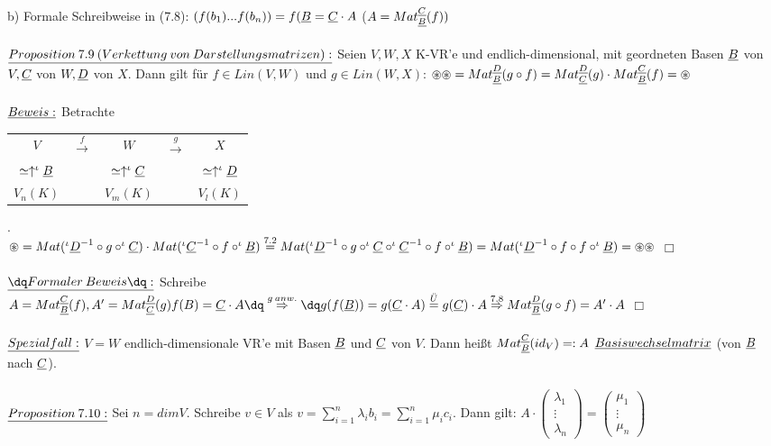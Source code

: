 \documentclass[fleqn, a4paper, 11pt]{scrartcl}
\theoremstyle{definition}
\begin{document}
b) Formale Schreibweise in (7.8): $(f(b_1)...f(b_n))=f(\uline{B}=\uline{C}\cdot A$ ($A=Mat_{\uline{B}}^{\uline{C}}(f))$\\
\\
$\uline{Proposition\:7.9\:(Verkettung\:von\:Darstellungsmatrizen):}$ Seien $V,W,X$ K-VR'e und endlich-dimensional, mit geordneten Basen $\uline{B}$ von $V,\uline{C}$ von $W,\uline{D}$ von $X$. Dann gilt für $f\in Lin(V,W)$ und $g\in Lin(W,X)$: $\circledast\circledast=Mat_{\uline{B}}^{\uline{D}}(g\circ f)=Mat_{\uline{C}}^{\uline{D}}(g)\cdot Mat_{\uline{B}}^{\uline{C}}(f)=\circledast$\\
\\
$\uline{Beweis:}$ Betrachte \begin{tabular}{ccccc}
	$V$ & $\stackrel{f}{\rightarrow}$ & $W$ & $\stackrel{g}{\rightarrow}$ & $X$ \\
	$\simeq\uparrow ^\iota\uline{B}$ & & $\simeq\uparrow ^\iota\uline{C}$ & & $\simeq\uparrow ^\iota\uline{D}$\\
	$V_n(K)$ & & $V_m(K)$ & & $V_l(K)$
\end{tabular}.\\
$\circledast=Mat(^\iota\uline{D}^{-1}\circ g\circ ^\iota\uline{C})\cdot Mat(^\iota\uline{C}^{-1}\circ f\circ ^\iota\uline{B})\stackrel{7.2}{=}Mat(^\iota\uline{D}^{-1}\circ g\circ ^\iota\uline{C}\circ^\iota\uline{C}^{-1}\circ f\circ^\iota\uline{B})=Mat(^\iota\uline{D}^{-1}\circ f\circ f\circ ^\iota\uline{B})=\circledast\circledast$ \hfill $\Box$\\
\\
$\uline{\dq Formaler\:Beweis\dq:}$ Schreibe $A=Mat_{\uline{B}}^{\uline{C}}(f),A'=Mat_{\uline{C}}^{\uline{D}}(g)\\
f(B)=\uline{C}\cdot A\dq\stackrel{g\:anw.}{\Rightarrow}\dq g(f(\uline{B}))=g(\uline{C}\cdot A)\stackrel{\ddot{U}}{=} g(\uline{C})\cdot A\stackrel{7.8}{\Rightarrow} Mat_{\uline{B}}^{\uline{D}}(g\circ f)=A'\cdot A$ \hfill $\Box$\\
\\
$\uline{Spezialfall:}$ $V=W$ endlich-dimensionale VR'e mit Basen $\uline{B}$ und $\uline{C}$ von $V$. Dann heißt $Mat_{\uline{B}}^{\uline{C}}(id_V)=:A$ $\uline{Basiswechselmatrix}$ (von $\uline{B}$ nach $\uline{C}$).\\
\\
$\uline{Proposition\:7.10:}$ Sei $n=dim V$. Schreibe $v\in V$ als $v=\sum\limits_{i=1}^n \lambda_i b_i=\sum\limits_{i=1}^n \mu_i c_i$. Dann gilt: $A\cdot \begin{pmatrix}
	\lambda_1\\
	\vdots\\
	\lambda_n
\end{pmatrix}=\begin{pmatrix}
	\mu_1\\
	\vdots\\
	\mu_n
\end{pmatrix}$\\
\end{document}
